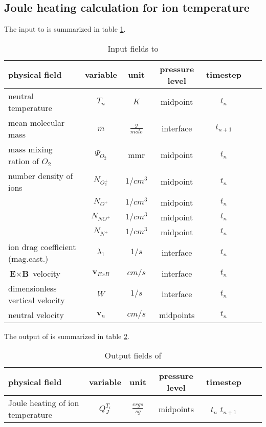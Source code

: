 \subsection{Joule heating calculation for ion temperature}
%
The input to  is summarized in table
\ref{tab:input_qjoule_ti}.
%
\begin{table}[tb]
\begin{tabular}{|p{3.5cm} ||c|c|c|c|c|c|} \hline
physical field               & variable        & unit&pressure
level& timestep
\\ \hline \hline
%
neutral temperature         & $T_n$           & $K$   & midpoint  & $t_n$\\
mean molecular mass         & $\overline{m}$  & $\frac{g}{mole}$ &interface & $t_{n+1}$ \\
mass mixing ration of $O_2$  & $\Psi_{O_2}$        & mmr  & midpoint & $t_n$\\
number density of ions       &  $N_{O_2^+}$      & $1/cm^3$  & midpoint & $t_n$\\
  {}       &  $N_{O^+}$      & $1/cm^3$  & midpoint & $t_n$ \\
 {}        &  $N_{NO^+}$     & $1/cm^3$  & midpoint & $t_n$ \\
 {}        &  $N_{N^+}$      & $1/cm^3$  & midpoint & $t_n$ \\
 ion drag coefficient (mag.east.)        &  $\lambda_1$      & $1/s$  & interface & $t_n$ \\
 $\textbf{E}\times\textbf{B}$ velocity   &  $\textbf{v}_{ExB}$& $cm/s$ & interface & $t_n$ \\
 dimensionless vertical velocity         &  $W$               & $1/s$  & interface & $t_{n}$ \\
 neutral velocity        &  $\textbf{v}_{n}$     & $cm/s$  & midpoints & $t_n$
 \\ \hline
\end{tabular}
\caption{Input fields to }
\label{tab:input_qjoule_ti}
\end{table}
%
The output of  is summarized in table
\ref{tab:output_qjoule_ti}.
%
\begin{table}[tb]
\begin{tabular}{|p{3.5cm} ||c|c|c|c|c|c|} \hline
physical field               & variable        & unit&pressure
level& timestep
\\ \hline \hline
%
Joule heating of ion temperature & $Q_J^{T_i}$     & $\frac{ergs}{s
g}$   & midpoints   & $t_n$ $t_{n+1}$
 \\ \hline
\end{tabular}
\caption{Output fields of }
\label{tab:output_qjoule_ti}
\end{table}
